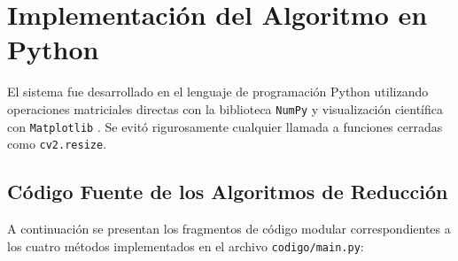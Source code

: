 \documentclass{article}
\begin{document}
\section{Implementación del Algoritmo en Python}

El sistema fue desarrollado en el lenguaje de programación Python utilizando operaciones matriciales directas con la biblioteca \texttt{NumPy} \cite{harris2020array} y visualización científica con \texttt{Matplotlib} \cite{hunter2007matplotlib}. Se evitó rigurosamente cualquier llamada a funciones cerradas como \texttt{cv2.resize}.

\subsection{Código Fuente de los Algoritmos de Reducción}
A continuación se presentan los fragmentos de código modular correspondientes a los cuatro métodos implementados en el archivo \texttt{codigo/main.py}:
\end{document}
